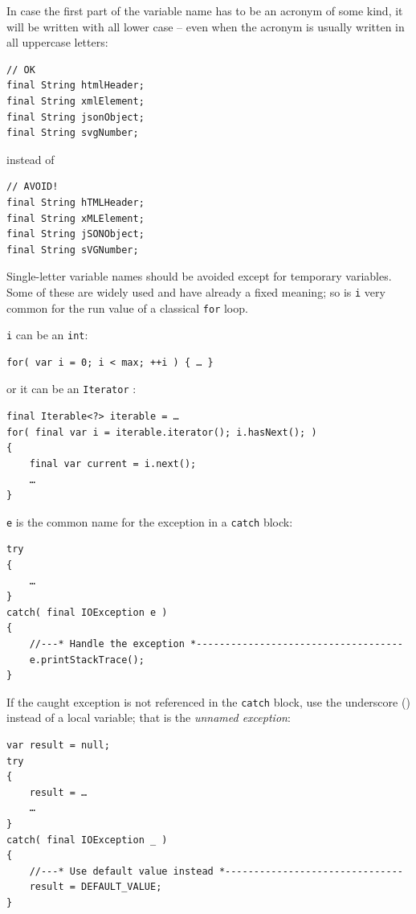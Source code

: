 In case the first part of the variable name has to be an acronym of some kind, it will be written with all lower case – even when the acronym is usually written in all uppercase letters:
\begin{lstlisting}
// OK
final String htmlHeader;
final String xmlElement;
final String jsonObject;
final String svgNumber;
\end{lstlisting}
instead of
\begin{lstlisting}
// AVOID!
final String hTMLHeader;
final String xMLElement;
final String jSONObject;
final String sVGNumber;
\end{lstlisting}

Single-letter variable names should be avoided except for temporary  variables. Some of these are widely used and have already a fixed meaning; so is \lstinline|i| very common for the run value of a classical \lstinline|for| loop.

\lstinline|i| can be an \lstinline|int|:
\begin{lstlisting}
for( var i = 0; i < max; ++i ) { … }
\end{lstlisting}
or it can be an \lstinline|Iterator|  \autocite{ORACLE_DOC_ITERABLE_INTERFACE,ORACLE_DOC_ITERATOR_INTERFACE}:
\begin{lstlisting}
final Iterable<?> iterable = …
for( final var i = iterable.iterator(); i.hasNext(); ) 
{
    final var current = i.next(); 
    … 
}
\end{lstlisting}
\lstinline|e| is the common name for the exception in a \lstinline|catch| block:
\begin{lstlisting}
try
{
    …
}
catch( final IOException e )
{
    //---* Handle the exception *------------------------------------
    e.printStackTrace();
}    
\end{lstlisting}

If the caught exception is not referenced in the \lstinline|catch| block, use the underscore (\bdq{\lstinline|_|}) instead of a local variable; that is the \textit{unnamed exception}:
\begin{lstlisting}
var result = null;
try
{
    result = …
    …
}
catch( final IOException _ )
{
    //---* Use default value instead *-------------------------------
    result = DEFAULT_VALUE;
}    
\end{lstlisting}

